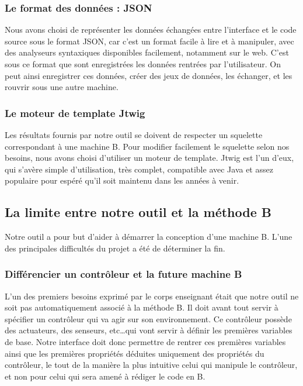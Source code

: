\documentclass[a4paper]{article}
\begin{document}
\subsubsection{Le format des données : JSON}
    Nous avons choisi de représenter les données échangées entre l'interface et le code source sous le format JSON, car c'est un format facile à lire et à manipuler, avec des analyseurs syntaxiques disponibles facilement, notamment sur le web. C'est sous ce format que sont enregistrées les données rentrées par l'utilisateur. On peut ainsi enregistrer ces données, créer des jeux de données, les échanger, et les rouvrir sous une autre machine. 

\subsubsection{Le moteur de template Jtwig}
    Les résultats fournis par notre outil se doivent de respecter un squelette correspondant à une machine B. Pour modifier facilement le squelette selon nos besoins, nous avons choisi d'utiliser un moteur de template. Jtwig est l'un d'eux, qui s'avère simple d'utilisation, très complet, compatible avec Java et assez populaire pour espéré qu'il soit maintenu dans les années à venir. 

\subsection{La limite entre notre outil et la méthode B}
    Notre outil a pour but d'aider à démarrer la conception d'une machine B. L'une des principales difficultés du projet a été de déterminer la fin.
    
\subsubsection{Différencier un contrôleur et la future machine B}
    L'un des premiers besoins exprimé par le corps enseignant était que notre outil ne soit pas automatiquement associé à la méthode B. Il doit avant tout servir à spécifier un contrôleur qui va agir sur son environnement. Ce contrôleur possède des actuateurs, des senseurs, etc\dots qui vont servir à définir les premières variables de base. Notre interface doit donc permettre de rentrer ces premières variables ainsi que les premières propriétés déduites uniquement des propriétés du contrôleur, le tout de la manière la plus intuitive celui qui manipule le contrôleur, et non pour celui qui sera amené à rédiger le code en B.
    
\end{document}
